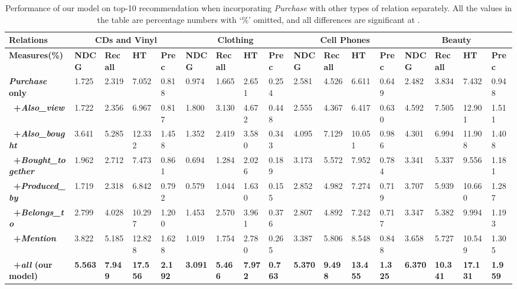 \documentclass[algorithms,article,accept,moreauthors,pdftex,10pt,a4paper]{Definitions/mdpi}
\begin{document}
\begin{table}[H]
\caption{Performance of our model on top-10 recommendation when incorporating \textit{Purchase} with other types of relation separately. 
		All the values in the table are percentage numbers with `\%' omitted, and all differences are significant at . 
	}
	\hspace{-1cm}
	\setlength{\tabcolsep}{1pt}
	\begin{tabular}
		{lllllllllllllllll} \toprule
		\bf{Relations} &  \multicolumn{4}{c}{\bf{CDs and Vinyl}} & \multicolumn{4}{c}{\bf{Clothing}} & \multicolumn{4}{c}{\bf{Cell Phones}} & \multicolumn{4}{c}{\bf{Beauty}}\\\hline
		\bf{Measures}(\%) & \bf{NDCG} & \bf{Recall} & \bf{HT} & \bf{Prec} & \bf{NDCG} & \bf{Recall} & \bf{HT} & \bf{Prec} & \bf{NDCG} & \bf{Recall} & \bf{HT} & \bf{Prec} & \bf{NDCG} & \bf{Recall} & \bf{HT} & \bf{Prec} \\\hline
		\bf{\textit{Purchase} only} & 1.725&	2.319&	7.052&	0.818&	0.974&	1.665&	2.651&	0.254&	2.581&	4.526&	6.611&	0.649&	2.482&	3.834&	7.432&	0.948 \\\hline
		\bf{~+\textit{Also\_view}} & 1.722&	2.356&	6.967&	0.817&	1.800&	3.130&	4.672&	0.448&	2.555&	4.367&	6.417&	0.630&	4.592&	7.505&	12.901&	1.511\\
		\bf{~+\textit{Also\_bought}} & 3.641&	5.285&	12.332&	1.458&	1.352&	2.419&	3.580&	0.343&	4.095&	7.129&	10.051&	0.986&	4.301&	6.994&	11.908&	1.408\\
		\bf{~+\textit{Bought\_together}} & 1.962&	2.712&	7.473&	0.861&	0.694&	1.284&	2.026&	0.189&	3.173&	5.572&	7.952&	0.784&	3.341&	5.337&	9.556&	1.181\\
		\bf{~+\textit{Produced\_by}} & 1.719&	2.318&	6.842&	0.792&	0.579&	1.044&	1.630&	0.155&	2.852&	4.982&	7.274&	0.719&	3.707&	5.939&	10.660&	1.287\\
		\bf{~+\textit{Belongs\_to}} & 2.799&	4.028&	10.297&	1.200&	1.453&	2.570&	3.961&	0.376&	2.807&	4.892&	7.242&	0.717&	3.347&	5.382&	9.994&	1.193\\
		\bf{~+\textit{Mention}} & 3.822&	5.185&	12.828&	1.628&	1.019&	1.754&	2.780&	0.265&	3.387&	5.806&	8.548&	0.848&	3.658&	5.727&	10.549&	1.305\\ \hline
		\bf{~+\textit{all}} (our model) & \textbf{5.563} & \textbf{7.949} & \textbf{17.556} & \textbf{2.192} & \textbf{3.091} & \textbf{5.466} & \textbf{7.972} & \textbf{0.763} & \textbf{5.370} & \textbf{9.498} & \textbf{13.455} & \textbf{1.325} & \textbf{6.370} & \textbf{10.341} & \textbf{17.131} & \textbf{1.959}\\
\bottomrule
	\end{tabular}\label{tab:info-result}
\end{table}
\end{document}
